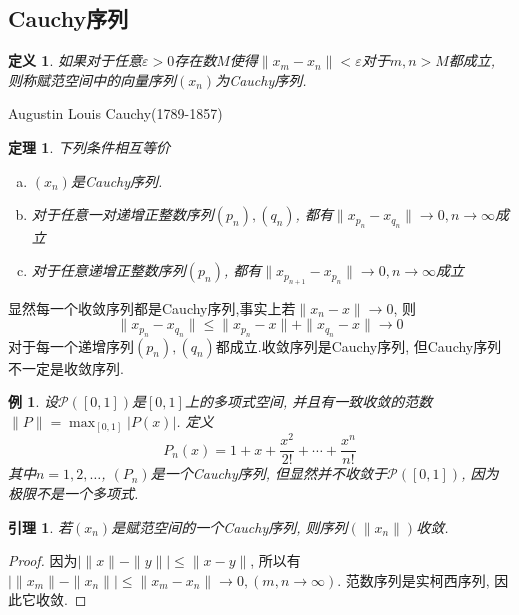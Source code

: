 \documentclass[a4paper,11pt]{book}
\newtheorem{definition}{\hspace{2em}定义}[section]
\newtheorem{theorem}{\hspace{2em}定理}[section]
\newtheorem{lemma}{\hspace{2em}引理}[section]
\newtheorem{proof}{证明}[section]
\newtheorem{example}{例}[section]
\begin{document}
\subsection*{Cauchy序列}
\begin{definition}
  如果对于任意$\varepsilon>0$存在数$M$使得$\|x_m-x_n\|<\varepsilon$对于$m,n>M$都成立, 则称赋范空间中的向量序列$(x_n)$为Cauchy序列.
\end{definition}
Augustin Louis Cauchy(1789-1857)
\begin{theorem}
  下列条件相互等价
  \begin{enumerate}[(a)]
    \item $(x_n)$是Cauchy序列.
    \item 对于任意一对递增正整数序列$(p_n),(q_n)$, 都有$\|x_{p_n}-x_{q_n}\|\to0,n\to\infty$成立
    \item 对于任意递增正整数序列$(p_n)$, 都有$\|x_{p_{n+1}}-x_{p_n}\|\to0,n\to\infty$成立
  \end{enumerate}
\end{theorem}
显然每一个收敛序列都是Cauchy序列,事实上若$\|x_n-x\|\to0$, 则
\begin{equation*}
  \|x_{p_n}-x_{q_n}\|\leq\|x_{p_n}-x\|+\|x_{q_n}-x\|\to0
\end{equation*}
对于每一个递增序列$(p_n),(q_n)$都成立.收敛序列是Cauchy序列, 但Cauchy序列不一定是收敛序列.
\begin{example}
  设$\mathcal{P}([0,1])$是$[0,1]$上的多项式空间, 并且有一致收敛的范数$\|P\|=\max_{[0,1]}|P(x)|$. 定义
  \begin{equation*}
    P_n(x)=1+x+\frac{x^2}{2!}+\cdots+\frac{x^n}{n!}
  \end{equation*}
  其中$n=1,2,\dots$, $(P_n)$是一个Cauchy序列, 但显然并不收敛于$\mathcal{P}([0,1])$, 因为极限不是一个多项式.
\end{example}
\begin{lemma}
  若$(x_n)$是赋范空间的一个Cauchy序列, 则序列$(\|x_n\|)$收敛.
\end{lemma}
\begin{proof}
  因为$|\|x\|-\|y\||\leq\|x-y\|$, 所以有$|\|x_m\|-\|x_n\||\leq\|x_m-x_n\|\to0,(m,n\to \infty)$. 范数序列是实柯西序列, 因此它收敛.
\end{proof}
\end{document}
